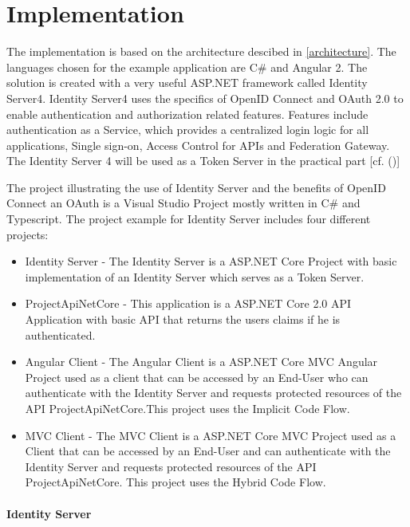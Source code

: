 \section{Implementation}

The implementation is based on the architecture descibed in \ref{architecture}. The languages chosen for the example application are C\# and Angular 2. The solution is created with a very useful ASP.NET framework called Identity Server4. Identity Server4 uses the specifics of OpenID Connect and OAuth 2.0 to enable authentication and authorization related features. Features include authentication as a Service, which provides a centralized login logic for all applications, Single sign-on, Access Control for APIs and Federation Gateway. The Identity Server 4 will be used as a Token Server in the practical part [cf. (\cite{Brock:2018:ID4})]

The project illustrating the use of Identity Server and the benefits of OpenID Connect an OAuth is a Visual Studio Project mostly written in C\# and Typescript. The project example for Identity Server includes four different projects:

\begin{itemize}
	\item Identity Server - The Identity Server is a ASP.NET Core Project with basic implementation of an Identity Server which serves as a Token Server. 
	\item ProjectApiNetCore - This application is a ASP.NET Core 2.0 API Application with basic API that returns the users claims if he is authenticated.
	\item Angular Client - The Angular Client is a ASP.NET Core MVC Angular Project used as a client that can be accessed by an End-User who can authenticate with the Identity Server and requests protected resources of the API ProjectApiNetCore.This project uses the Implicit Code Flow. 
	\item MVC Client - The MVC Client is a ASP.NET Core MVC Project used as a Client that can be accessed by an End-User and can authenticate with the Identity Server and requests protected resources of the API ProjectApiNetCore. This project uses the Hybrid Code Flow. 
\end{itemize}



\paragraph{Identity Server}

